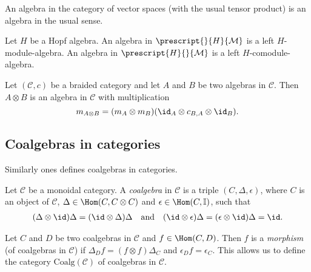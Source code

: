 \documentclass[12pt]{amsproc}
\newcommand{\lmod}[1]{\prescript{}{#1}{\mathcal{M}}}
\newcommand{\lcomod}[1]{\prescript{#1}{}{\mathcal{M}}}
\begin{document}
\begin{example}
An algebra in the category of vector spaces (with the usual tensor product) is an algebra in
the usual sense.
\end{example}

\begin{example}
Let $H$ be a Hopf algebra. An algebra in $\lmod{H}$ is a left $H$-module-algebra. 
An algebra in $\lcomod{H}$ 
is a left 
$H$-comodule-algebra.
\end{example}




\begin{example}
Let $(\mathcal{C},c)$ be a braided category and let $A$ and $B$ be two algebras
in $\mathcal{C}$. Then $A\otimes B$ is an algebra in $\mathcal{C}$ with
multiplication 
\[
m_{A\otimes B}=(m_A\otimes m_B)(\id_A\otimes c_{B,A}\otimes \id_B).
\]
\end{example}

\subsection{Coalgebras in categories}
Similarly ones defines coalgebras in categories.

\begin{definition}
Let $\mathcal{C}$ be a monoidal category. A \emph{coalgebra}
in $\mathcal{C}$ is a triple $(C,\Delta,\epsilon)$, where
$C$ is an object of $\mathcal{C}$, $\Delta\in\Hom(C,C\otimes C)$
and $\epsilon\in\Hom(C,\mathbb{I})$, such that 
\begin{gather*}
(\Delta\otimes\id)\Delta=(\id\otimes\Delta)\Delta\quad\text{and}\quad 
(\id\otimes\epsilon)\Delta=(\epsilon\otimes\id)\Delta=\id.
\end{gather*}
\end{definition}

Let $C$ and $D$ be two coalgebras in $\mathcal{C}$ and $f\in\Hom(C,D)$.
Then $f$ is a \emph{morphism} (of coalgebras in $\mathcal{C}$)
if $\Delta_{D}f=(f\otimes f)\Delta_{C}$ and $\epsilon_{D}f=\epsilon_{C}$. 
This allows us to define the category $\mathrm{Coalg}(\mathcal{C})$
of coalgebras in $\mathcal{C}$.
\end{document}
